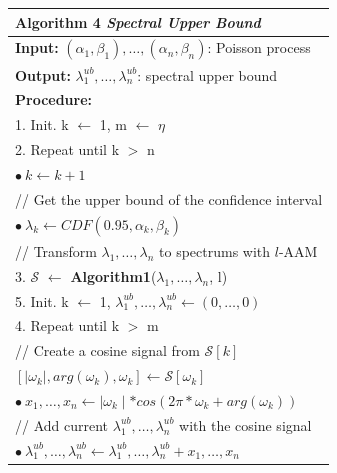 \begin{figure}[t!]
	\begin{center}
		\begin{tabular*}{0.5\textwidth}{l @{\extracolsep{\fill}}}
			\hline
			\textbf{Algorithm 4} \textit{Spectral Upper Bound} \\
			\hline
			\textbf{Input:} $(\alpha_1, \beta_1), \ldots, (\alpha_n, \beta_n)$: Poisson process \\
			\textbf{Output:} $\lambda^{ub}_1, \ldots, \lambda^{ub}_n$: spectral upper bound \\
			\textbf{Procedure:}\\
			\hspace{0.3cm} 1. Init. k $\leftarrow$ 1, m $\leftarrow$ $\eta$ \\
			\hspace{0.3cm} 2. Repeat until k $>$ n \\
			\hspace{0.7cm} $\bullet ~ k \leftarrow k + 1$ \\
			\hspace{0.7cm} // Get the upper bound of the confidence interval \\
			\hspace{0.7cm} $\bullet ~ \lambda_k \leftarrow CDF(0.95, \alpha_k, \beta_k)$ \\
			\hspace{0.3cm} // Transform $\lambda_1, \ldots, \lambda_n$ to spectrums with $l$-AAM \\
			\hspace{0.3cm} 3. $\mathcal S$ $\leftarrow$ \textbf{Algorithm1}($\lambda_1, \ldots, \lambda_n$, l) \\
			\hspace{0.3cm} 5. Init. k $\leftarrow$ 1,  $\lambda^{ub}_1, \ldots, \lambda^{ub}_n \leftarrow (0, \ldots, 0)$ \\
			\hspace{0.3cm} 4. Repeat until k $>$ m \\
			\hspace{0.7cm} // Create a cosine signal from $\mathcal S[k]$ \\
			\hspace{0.7cm} $[\mid \omega_k \mid, arg(\omega_k), \omega_k] \leftarrow \mathcal S[\omega_k]$ \\
			\hspace{0.7cm} $\bullet ~ x_1, \ldots, x_n \leftarrow \mid \omega_k \mid * cos(2 \pi * \omega_k + arg(\omega_k))$ \\
			\hspace{0.7cm} // Add current $\lambda^{ub}_1, \ldots, \lambda^{ub}_n$ with the cosine signal \\
			\hspace{0.7cm} $\bullet ~ \lambda^{ub}_1, \ldots, \lambda^{ub}_n \leftarrow \lambda^{ub}_1, \ldots, \lambda^{ub}_n + x_1, \ldots, x_n$ \\
			\hline
		\end{tabular*}	
	\end{center}
\end{figure} 

